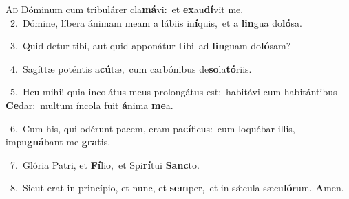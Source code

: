 \lettrine{\initial\textcolor{\initialcolor}{A}}{d} Dóminum cum tribulárer cla\-\textbf{má}\-vi:~\star et \textbf{ex}\-au\-\textbf{dí}\-vit me.\\
{\numbfont\textcolor{\numbcolor}{~2.}}~Dómine, líbera ánimam meam a lábiis in\-\textbf{í}\-quis,~\star et a \textbf{lin}\-gua do\-\textbf{ló}\-sa.\par
{\numbfont\textcolor{\numbcolor}{~3.}}~Quid detur tibi, aut quid apponátur \textbf{ti}\-bi~\star ad \textbf{lin}\-guam do\-\textbf{ló}\-sam?\par
{\numbfont\textcolor{\numbcolor}{~4.}}~Sagíttæ poténtis a\-\textbf{cú}\-tæ,~\star cum carbónibus de\-\textbf{so}\-la\-\textbf{tó}\-riis.\par
{\numbfont\textcolor{\numbcolor}{~5.}}~Heu mihi! quia incolátus meus prolongátus est:~\dagger habitávi cum habitántibus \textbf{Ce}\-dar:~\star multum íncola fuit \textbf{á}\-nima \textbf{me}\-a.\par
{\numbfont\textcolor{\numbcolor}{~6.}}~Cum his, qui odérunt pacem, eram pa\-\textbf{cí}\-ficus:~\star cum loquébar illis, impu\-\textbf{gná}\-bant me \textbf{gra}\-tis.\par
{\numbfont\textcolor{\numbcolor}{~7.}}~Glória Patri, et \textbf{Fí}\-lio,~\star et Spi\-\textbf{rí}\-tui \textbf{Sanc}\-to.\par
{\numbfont\textcolor{\numbcolor}{~8.}}~Sicut erat in princípio, et nunc, et \textbf{sem}\-per,~\star et in sǽcula sæcu\-\textbf{ló}\-rum. \textbf{A}\-men.\par
